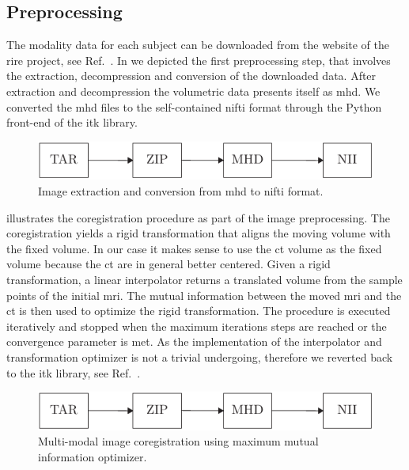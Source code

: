 \subsection{Preprocessing}

The modality data for each subject can be downloaded from the website of the
\gls{rire} project, see Ref.~\cite{RIRE}. In  we depicted
the first preprocessing step, that involves the extraction, decompression and
conversion of the downloaded data. After extraction and decompression the
volumetric data presents itself as \gls{mhd}. We converted the \gls{mhd} files
to the self-contained \gls{nifti} format through the Python front-end of the
\gls{itk} library.
\begin{figure}[h]
  \centering
  \includegraphics[page=1,width=\linewidth]{figure/diagrams.pdf}
  \caption{Image extraction and conversion from \gls{mhd} to \gls{nifti}
		format.
	}\label{fig:conversion}
\end{figure}
 illustrates the coregistration procedure as part of
the image preprocessing. The coregistration yields a rigid transformation that
aligns the moving volume with the fixed volume. In our case it makes sense to
use the \gls{ct} volume as the fixed volume because the \gls{ct} are in
general better centered. Given a rigid transformation, a linear interpolator
returns a translated volume from the sample points of the initial \gls{mri}.
The mutual information between the moved \gls{mri} and the \gls{ct} is then
used to optimize the rigid transformation. The procedure is executed
iteratively and stopped when the maximum iterations steps are reached or
the convergence parameter is met. As the implementation of the interpolator
and transformation optimizer is not a trivial undergoing, therefore we
reverted back to the \gls{itk} library, see Ref.~\cite{Yaniv2018}.
\begin{figure}[h]
  \centering
  \includegraphics[page=2,width=\linewidth]{figure/diagrams.pdf}
  \caption{Multi-modal image coregistration using maximum mutual information
    optimizer.
	}\label{fig:registration}
\end{figure}
